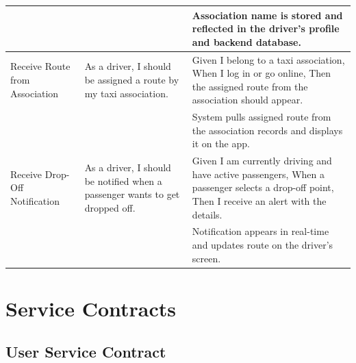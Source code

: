 \documentclass[a4paper,12pt]{article}
\begin{document}
\begin{longtable}{>{\raggedright}p{4cm} p{6cm} p{5cm}}
& & Association name is stored and reflected in the driver's profile and backend database. \\ \midrule
Receive Route from Association & As a driver, I should be assigned a route by my taxi association. & Given I belong to a taxi association, When I log in or go online, Then the assigned route from the association should appear. \\
& & System pulls assigned route from the association records and displays it on the app. \\ \midrule
Receive Drop-Off Notification & As a driver, I should be notified when a passenger wants to get dropped off. & Given I am currently driving and have active passengers, When a passenger selects a drop-off point, Then I receive an alert with the details. \\
& & Notification appears in real-time and updates route on the driver’s screen. \\
\bottomrule
\end{longtable}

\section{Service Contracts}

\subsection*{User Service Contract}
\end{document}
